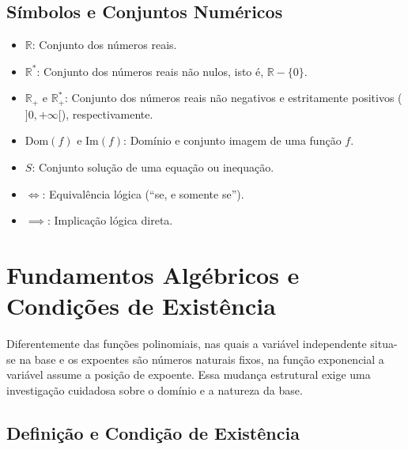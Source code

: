 \documentclass[12pt,a4paper]{report}
\begin{document}
	\vspace{0.4cm}
	
	\section*{Símbolos e Conjuntos Numéricos}
	
	\begin{itemize}[leftmargin=1.5cm, label=$\bullet$]
		\item $\mathbb{R}$: Conjunto dos números reais.
		\item $\mathbb{R}^*$: Conjunto dos números reais não nulos, isto é, $\mathbb{R} - \{0\}$.
		\item $\mathbb{R}_+$ e $\mathbb{R}^*_+$: Conjunto dos números reais não negativos e estritamente positivos (${]0, +\infty[}$), respectivamente.
		\item $\text{Dom}(f)$ e $\text{Im}(f)$: Domínio e conjunto imagem de uma função $f$.
		\item $S$: Conjunto solução de uma equação ou inequação.
		\item $\iff$: Equivalência lógica (``se, e somente se'').
		\item $\implies$: Implicação lógica direta.
	\end{itemize}
	
	\clearpage
	
	\tableofcontents
	\thispagestyle{empty}
	
	\clearpage
		
	\chapter{Fundamentos Algébricos e Condições de Existência}
	\label{sec:algebricas_exp}
	
	Diferentemente das funções polinomiais, nas quais a variável independente situa-se na base e os expoentes são números naturais fixos, na função exponencial a variável assume a posição de expoente. Essa mudança estrutural exige uma investigação cuidadosa sobre o domínio e a natureza da base.
	
	\section{Definição e Condição de Existência}
	\label{subsec:cond_existencia}
	
\end{document}
